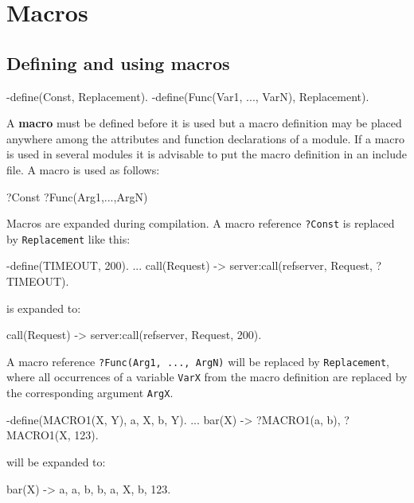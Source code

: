 \chapter{Macros}
\label{macros}

\section{Defining and using macros}

\begin{erlang}
-define(Const, Replacement).
-define(Func(Var1, ..., VarN), Replacement).
\end{erlang}

A \textbf{macro} must be defined before it is used but a macro
definition may be placed anywhere among the attributes and function
declarations of a module. If a macro is used in several modules it is
advisable to put the macro definition in an include file. A macro is
used as follows:

\begin{erlang}
?Const
?Func(Arg1,...,ArgN)
\end{erlang}

Macros are expanded during compilation. A macro reference
\texttt{?Const} is replaced by \texttt{Replacement} like this:

\begin{erlang}
-define(TIMEOUT, 200).
...
call(Request) ->
    server:call(refserver, Request, ?TIMEOUT).
\end{erlang}

is expanded to:

\begin{erlang}
call(Request) ->
    server:call(refserver, Request, 200).
\end{erlang}

A macro reference \texttt{?Func(Arg1, ..., ArgN)} will be replaced by
\texttt{Replacement}, where all occurrences of a variable \texttt{VarX}
from the macro definition are replaced by the corresponding argument
\texttt{ArgX}.

\begin{erlang}
-define(MACRO1(X, Y), {a, X, b, Y}).
...
bar(X) ->
    ?MACRO1(a, b),
    ?MACRO1(X, 123).
\end{erlang}

will be expanded to:

\begin{erlang}
bar(X) ->
    {a, a, b, b},
    {a, X, b, 123}.
\end{erlang}

